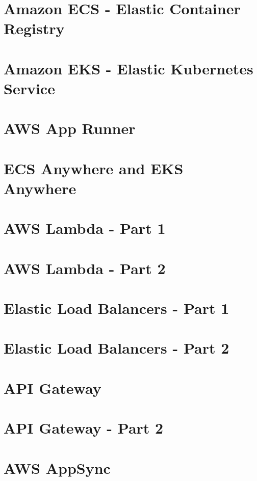 \documentclass[11pt]{book}
\begin{document}
    \section{Amazon ECS - Elastic Container Registry}


    \section{Amazon EKS - Elastic Kubernetes Service}


    \section{AWS App Runner}


    \section{ECS Anywhere and EKS Anywhere}


    \section{AWS Lambda - Part 1}


    \section{AWS Lambda - Part 2}


    \section{Elastic Load Balancers - Part 1}


    \section{Elastic Load Balancers - Part 2}


    \section{API Gateway}


    \section{API Gateway - Part 2}


    \section{AWS AppSync}
\end{document}
